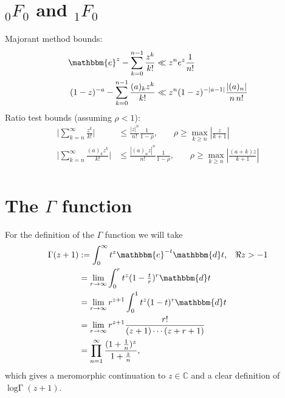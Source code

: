 \documentclass[12pt]{article}
\newcommand{\ee}[0] {\mathbbm{e}}
\newcommand{\dd}[0] {\mathbbm{d}}
\newcommand{\logG} {\operatorname {log \Gamma}}
\numberwithin{equation}{section}
\begin{document}
\section{${}_0 F_0$ and ${}_1 F_0$}
Majorant method bounds:
\begin{equation}
\label{equ_f0_maj}
\begin{alignedat}{3}
\ee^z - \sum_{k=0}^{n-1} \frac{z^k}{k!} &\ll z^n e^z \frac{1}{n!}\\
(1-z)^{-a} - \sum_{k=0}^{n-1} \frac{(a)_k z^k}{k!} &\ll z^n (1-z)^{-|a-1|} \frac{|(a)_n|}{n \, n!}\\
\end{alignedat}
\end{equation}
Ratio test bounds (assuming $\rho < 1$):
\begin{equation}
\begin{alignedat}{3}
\Big| \sum_{k=n}^{\infty} \frac{z^k}{k!} \Big| &\le \frac{|z|^n}{n!} \frac{1}{1-\rho}\text{,} \quad \quad \rho \ge \max_{k \ge n} | \tfrac{z}{k+1} | \\
\Big|\sum_{k=n}^{\infty} \frac{(a)_k z^k}{k!} \Big| &\le \frac{|(a)_n z|^n}{n!} \frac{1}{1-\rho}\text{,} \quad \quad \rho \ge \max_{k \ge n} | \tfrac{(a+k)z}{k+1} | \\
\end{alignedat}
\end{equation}

\section{The $\Gamma$ function}
For the definition of the $\Gamma$ function we will take
\begin{align*}
\Gamma(z+1) &:= \int_0^{\infty} t^z \ee^{-t} \dd t\text{,} \quad \Re z > -1\\
&= \lim_{r \to \infty} \int_0^{r} t^z (1-\tfrac{t}{r})^r \dd t \\
&= \lim_{r \to \infty} r^{z+1} \int_{0}^{1} t^z (1-t)^r \dd t \\
&= \lim_{r \to \infty} r^{z+1} \frac{r!}{(z+1) \cdots (z+r+1)} \\
&= \prod_{n=1} ^{\infty} \frac{(1+\frac{1}{n})^z}{1+\frac{z}{n}}\text{,}
\end{align*}
which gives a meromorphic continuation to $z \in \mathbb{C}$ and a clear definition of $\logG(z+1)$.
\end{document}
